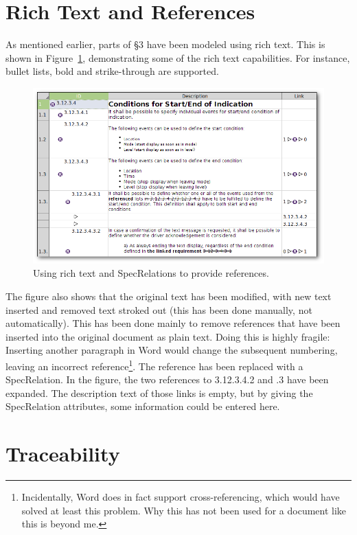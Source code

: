 \documentclass{template/openetcs_report}
\begin{document}
\section{Rich Text and References}

As mentioned earlier, parts of §3 have been modeled using rich text.  This is shown in Figure~\ref{fig:xhtml-and-links}, demonstrating some of the rich text capabilities.  For instance, bullet lists, bold and strike-through are supported.

\begin{figure}
	\begin{center}
	\includegraphics[width=.8\textwidth]{img/xhtml-and-links.png}
	\end{center}
	\caption{Using rich text and SpecRelations to provide references.}
	\label{fig:xhtml-and-links}
\end{figure}

The figure also shows that the original text has been modified, with new text inserted and removed text stroked out (this has been done manually, not automatically).  This has been done mainly to remove references that have been inserted into the original document as plain text.  Doing this is highly fragile: Inserting another paragraph in Word would change the subsequent numbering, leaving an incorrect reference\footnote{Incidentally, Word does in fact support cross-referencing, which would have solved at least this problem.  Why this has not been used for a document like this is beyond me.}.  The reference has been replaced with a SpecRelation.  In the figure, the two references to 3.12.3.4.2 and .3 have been expanded.  The description text of those links is empty, but by giving the SpecRelation attributes, some information could be entered here.

\section{Traceability}
\end{document}
